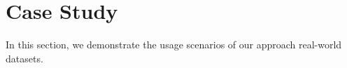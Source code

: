\section{Case Study}
In this section, we demonstrate the usage scenarios of our approach  real-world datasets.


